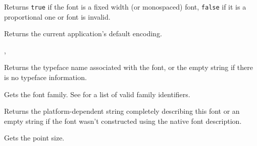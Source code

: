 
Returns {\tt true} if the font is a fixed width (or monospaced) font, 
{\tt false} if it is a proportional one or font is invalid.

\label{wxfontgetdefaultencoding}


Returns the current application's default encoding.


, 

\label{wxfontgetfacename}


Returns the typeface name associated with the font, or the empty string if there is no
typeface information.



\label{wxfontgetfamily}


Gets the font family. See  for a list of valid
family identifiers.



\label{wxfontgetnativefontinfodesc}


Returns the platform-dependent string completely describing this font or an
empty string if the font wasn't constructed using the native font description.



\label{wxfontgetpointsize}


Gets the point size.


